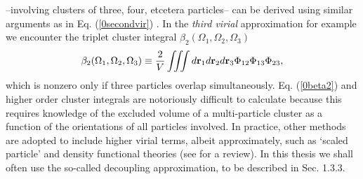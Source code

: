 {--involving clusters of three, four, etcetera particles--
can be derived using similar arguments as in Eq. (\ref{0secondvir}) \cite{vankampen}.
In the {\em third virial} approximation for example we encounter the triplet cluster
integral $\beta_{2}(\Omega_{1},\Omega_{2},\Omega_{3})$
\begin{equation}
\beta_{2}(\Omega_{1},\Omega_{2},\Omega_{3})\equiv \frac{2}{V}\iiint
d{\bf r}_{1}d{\bf r}_{2}d{\bf r}_{3} \Phi_{12}\Phi_{13}\Phi_{23}, \label{0beta2}
\end{equation}
which is nonzero only if three particles overlap simultaneously.
Eq. (\ref{0beta2}) and higher order cluster integrals are notoriously difficult to calculate
because this requires knowledge of the excluded volume of a multi-particle
cluster as a function of the orientations of all particles involved.
In practice, other methods are adopted to include higher virial terms, albeit
approximately, such as
`scaled particle' \cite{Cotterspt,Cotter} and density functional theories (see \cite{Vroege92,DFTspecialJPCM} for a review).
In this thesis we shall often use the so-called decoupling approximation, to be described
in Sec. 1.3.3.


}
